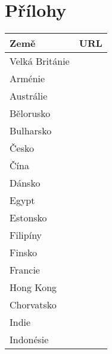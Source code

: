 \chapter{Přílohy}  \label{chap:prilohy}
	\begin{table}[H]
	\centering
	\begin{tabular}{|>{\centering\arraybackslash}p{2.2cm}|>{\centering\arraybackslash}p{9cm}|} 
	\hline
	\textbf{Země}    & \textbf{URL} \\ 
	\hline
	Velká Británie & \MYhref{https://www.gov.uk/topic/intellectual-property}{https://www.gov.uk/topic/intellectual-property} \\
	\hline
	Arménie & \MYhref{https://www.aipa.am/hy/}{https://www.aipa.am/hy/}\\
	\hline
	Austrálie & \MYhref{https://www.ipaustralia.gov.au/}{https://www.ipaustralia.gov.au/} \\
	\hline
	Bělorusko & \MYhref{https://www.ncip.by/}{https://www.ncip.by/} \\
	\hline
	Bulharsko & \MYhref{https://www.bpo.bg/}{https://www.bpo.bg/} \\
	\hline
	Česko & \MYhref{https://upv.gov.cz/}{https://upv.gov.cz/}  \\
	\hline
	Čína & \MYhref{https://www.cnipa.gov.cn/}{https://www.cnipa.gov.cn/}\\
	\hline
	Dánsko & \MYhref{https://www.dkpto.org/}{https://www.dkpto.org/}  \\
	\hline
	Egypt & \MYhref{http://www.egypo.gov.eg}{http://www.egypo.gov.eg} \\
	\hline
	Estonsko & \MYhref{https://www.epa.ee/et}{https://www.epa.ee/et} \\
	\hline
	Filipíny & \MYhref{http://www.ipophil.gov.ph/}{http://www.ipophil.gov.ph/}  \\
	\hline
	Finsko & \MYhref{http://www.prh.fi/en/index.html}{http://www.prh.fi/en/index.html}  \\
	\hline
	Francie & \MYhref{http://www.inpi.fr/}{http://www.inpi.fr/}\\
	\hline
	Hong Kong & \MYhref{https://www.ipd.gov.hk/index.htm}{https://www.ipd.gov.hk/index.htm}  \\
	\hline
	Chorvatsko & \MYhref{https://www.dziv.hr/}{https://www.dziv.hr/} \\
	\hline
	Indie & \MYhref{http://www.ipindia.nic.in/}{http://www.ipindia.nic.in/}  \\
	\hline
	Indonésie & \MYhref{http://www.dgip.go.id/}{http://www.dgip.go.id/}\\

\end{tabular}
\end{table}

